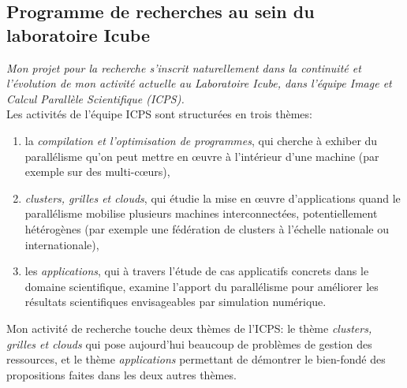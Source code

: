\documentclass[11pt]{article}
\begin{document}
\subsection{Programme de recherches au sein du laboratoire Icube}

\textit{Mon projet pour la recherche  s'inscrit naturellement dans la continuité
  et l'évolution  de mon activité  actuelle au Laboratoire Icube,  dans l'équipe
  Image et  Calcul Parallèle  Scientifique (ICPS).}\\


Les activités de l'équipe ICPS sont structurées en trois thèmes: 
\begin{enumerate}
\item la  \textit{compilation et  l'optimisation de  programmes}, qui  cherche à
  exhiber du  parallélisme qu'on  peut mettre en  {\oe}uvre à  l'intérieur d'une
  machine (par exemple sur des multi-c{\oe}urs),
\item  \textit{clusters, grilles  et clouds},  qui étudie  la mise  en {\oe}uvre
  d'applications   quand    le   parallélisme   mobilise    plusieurs   machines
  interconnectées, potentiellement  hétérogènes (par  exemple une  fédération de
  clusters à l'échelle nationale ou internationale),
\item  les  \textit{applications}, qui  à  travers  l'étude de  cas  applicatifs
  concrets dans le  domaine scientifique, examine l'apport  du parallélisme pour
  améliorer les résultats scientifiques envisageables par simulation numérique.
\end{enumerate}

Mon   activité  de   recherche  touche   deux   thèmes  de   l'ICPS:  le   thème
\textit{clusters, grilles et clouds} qui  pose aujourd'hui beaucoup de problèmes
de  gestion des  ressources,  et le  thème  \textit{applications} permettant  de
démontrer le bien-fondé des propositions faites dans les deux autres thèmes.
\end{document}
